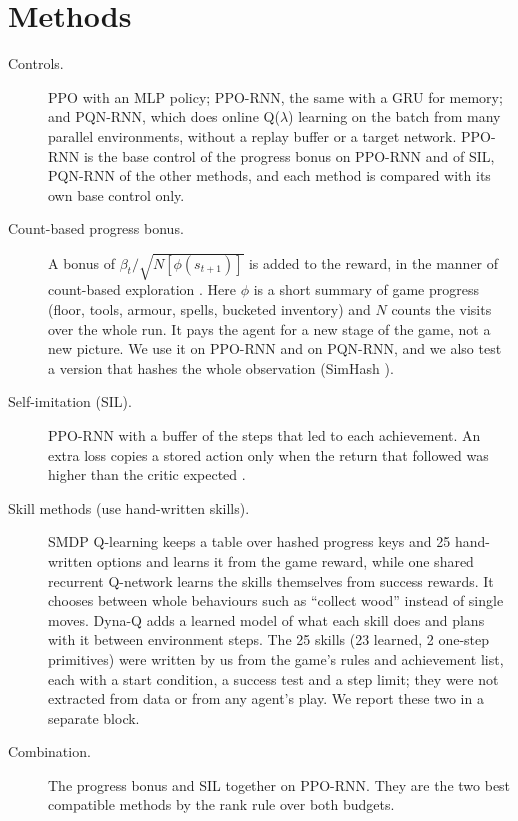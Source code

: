 \documentclass[cameraready]{Interspeech}
\begin{document}
\section{Methods}

\begin{description}
\item[Controls.] PPO \cite{schulman2017proximal} with an MLP policy; PPO-RNN, the same with a GRU \cite{cho2014learning} for memory; and PQN-RNN, which does online Q($\lambda$) learning on the batch from many parallel environments, without a replay buffer or a target network. PPO-RNN is the base control of the progress bonus on PPO-RNN and of SIL, PQN-RNN of the other methods, and each method is compared with its own base control only.
\item[Count-based progress bonus.] A bonus of $\beta_t/\sqrt{N[\phi(s_{t+1})]}$ is added to the reward, in the manner of count-based exploration \cite{bellemare2016unifying}. Here $\phi$ is a short summary of game progress (floor, tools, armour, spells, bucketed inventory) and $N$ counts the visits over the whole run. It pays the agent for a new stage of the game, not a new picture. We use it on PPO-RNN and on PQN-RNN, and we also test a version that hashes the whole observation (SimHash \cite{tang2017exploration}).
\item[Self-imitation (SIL).] PPO-RNN with a buffer of the steps that led to each achievement. An extra loss copies a stored action only when the return that followed was higher than the critic expected \cite{oh2018self}.
\item[Skill methods (use hand-written skills).] SMDP Q-learning \cite{sutton1999between} keeps a table over hashed progress keys and 25 hand-written options and learns it from the game reward, while one shared recurrent Q-network learns the skills themselves from success rewards. It chooses between whole behaviours such as ``collect wood'' instead of single moves. Dyna-Q \cite{sutton1990integrated} adds a learned model of what each skill does and plans with it between environment steps. The 25 skills (23 learned, 2 one-step primitives) were written by us from the game's rules and achievement list, each with a start condition, a success test and a step limit; they were not extracted from data or from any agent's play. We report these two in a separate block.
\item[Combination.] The progress bonus and SIL together on PPO-RNN. They are the two best compatible methods by the rank rule over both budgets.
\end{description}
\end{document}
